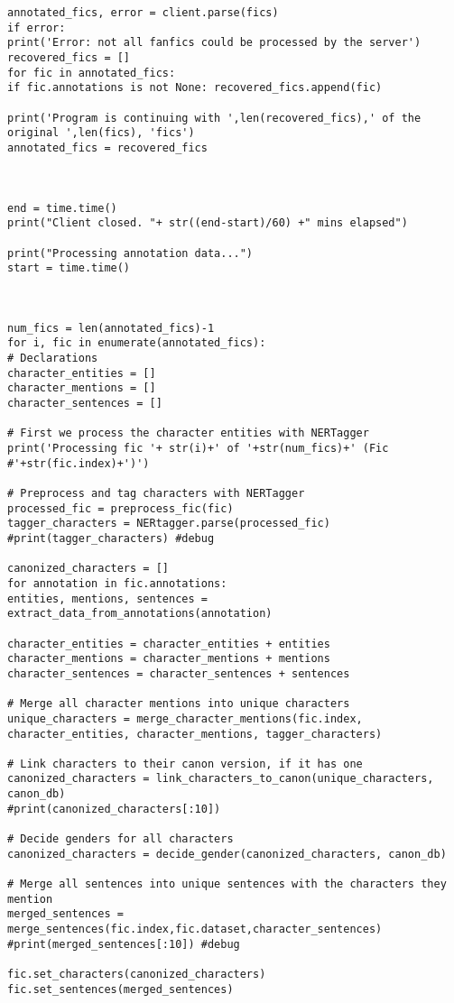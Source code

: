 \documentclass{pre-tfg}
\begin{document}
\begin{lstlisting}[style=consola]
annotated_fics, error = client.parse(fics)
if error:
print('Error: not all fanfics could be processed by the server')
recovered_fics = []
for fic in annotated_fics:
if fic.annotations is not None: recovered_fics.append(fic)

print('Program is continuing with ',len(recovered_fics),' of the original ',len(fics), 'fics')
annotated_fics = recovered_fics



end = time.time()
print("Client closed. "+ str((end-start)/60) +" mins elapsed")

print("Processing annotation data...")
start = time.time()



num_fics = len(annotated_fics)-1
for i, fic in enumerate(annotated_fics):
# Declarations
character_entities = []
character_mentions = []
character_sentences = []

# First we process the character entities with NERTagger
print('Processing fic '+ str(i)+' of '+str(num_fics)+' (Fic #'+str(fic.index)+')')

# Preprocess and tag characters with NERTagger
processed_fic = preprocess_fic(fic)
tagger_characters = NERtagger.parse(processed_fic)
#print(tagger_characters) #debug

canonized_characters = []
for annotation in fic.annotations:
entities, mentions, sentences = extract_data_from_annotations(annotation)

character_entities = character_entities + entities
character_mentions = character_mentions + mentions
character_sentences = character_sentences + sentences

# Merge all character mentions into unique characters
unique_characters = merge_character_mentions(fic.index, character_entities, character_mentions, tagger_characters)

# Link characters to their canon version, if it has one
canonized_characters = link_characters_to_canon(unique_characters, canon_db)
#print(canonized_characters[:10])

# Decide genders for all characters
canonized_characters = decide_gender(canonized_characters, canon_db)

# Merge all sentences into unique sentences with the characters they mention
merged_sentences = merge_sentences(fic.index,fic.dataset,character_sentences)
#print(merged_sentences[:10]) #debug

fic.set_characters(canonized_characters)
fic.set_sentences(merged_sentences)



\end{lstlisting}
\end{document}
